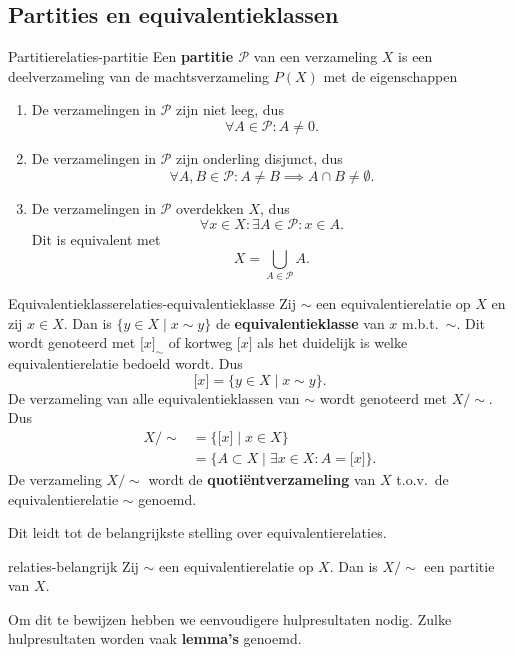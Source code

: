 \subsection{Partities en equivalentieklassen}
\begin{definitie}{Partitie}{relaties-partitie}
    Een \textbf{partitie $\mathcal{P}$} van een verzameling $X$ is een deelverzameling van de machtsverzameling $P(X)$ met de eigenschappen
    \begin{enumerate}[label = (\alph*)]
        \item De verzamelingen in $\mathcal{P}$ zijn niet leeg, dus
            \[
                \forall A \in \mathcal{P}: A \neq 0.
            \]
        \item De verzamelingen in $\mathcal{P}$ zijn onderling disjunct, dus
            \[
                \forall A, B \in \mathcal{P}: A \neq B \implies A \cap B \neq \emptyset.
            \]
        \item De verzamelingen in $\mathcal{P}$ overdekken $X$, dus
            \[
                \forall x \in X: \exists A \in \mathcal{P}: x \in A.
            \]
            Dit is equivalent met
            \[
                X = \bigcup_{A \in \mathcal{P}} A.
            \]
    \end{enumerate}
\end{definitie}
\begin{definitie}{Equivalentieklasse}{relaties-equivalentieklasse}
    Zij $\sim$ een equivalentierelatie op $X$ en zij $x \in X$.
    Dan is $\{y \in X \mid x \sim y\}$ de \textbf{equivalentieklasse} van $x$ m.b.t.\ $\sim$.
    Dit wordt genoteerd met $\lbrack x \rbrack_\sim$ of kortweg $\lbrack x \rbrack$ als het duidelijk is welke equivalentierelatie bedoeld wordt.
    Dus
    \[
        \lbrack x \rbrack = \{y \in X \mid x \sim y\}.
    \]
    De verzameling van alle equivalentieklassen van $\sim$ wordt genoteerd met $X \slash \sim$.
    Dus
    \begin{align*}
        X \slash \sim &= \{\lbrack x \rbrack \mid x \in X\} \\
                      &= \{A \subset X \mid \exists x \in X: A = \lbrack x \rbrack\}.
    \end{align*}
    De verzameling $X \slash \sim$ wordt de \textbf{quotiëntverzameling} van $X$ t.o.v.\ de equivalentierelatie $\sim$ genoemd.
\end{definitie}
Dit leidt tot de belangrijkste stelling over equivalentierelaties.

\begin{stelling}{}{relaties-belangrijk}
    Zij $\sim$ een equivalentierelatie op $X$.
    Dan is $X \slash \sim$ een partitie van $X$.
\end{stelling}
Om dit te bewijzen hebben we eenvoudigere hulpresultaten nodig.
Zulke hulpresultaten worden vaak \textbf{lemma's} genoemd.

